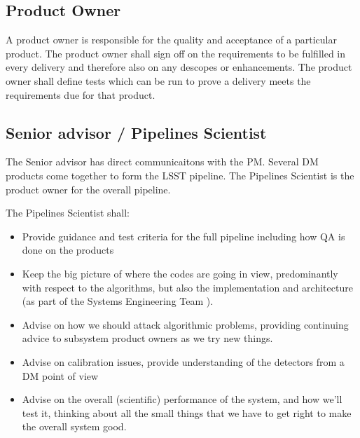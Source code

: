 \subsection{Product Owner \label{role:prodo}}

A product owner is responsible for the quality and acceptance of a particular product.
The product owner shall sign off on the requirements to be fulfilled in every delivery and therefore also on any descopes or enhancements.
The product owner shall define tests which can be run to prove a delivery meets the requirements due for that product.

\subsection{Senior advisor / Pipelines Scientist \label{role:pipe}}

The Senior advisor has direct communicaitons with the \gls{PM}. Several \gls{DM} products come together to form the \gls{LSST} \gls{pipeline}. The Pipelines Scientist is the product owner for the overall \gls{pipeline}.

The Pipelines Scientist shall:

\begin{itemize}

\item Provide guidance and test criteria for the full \gls{pipeline} including how \gls{QA} is done on the products
\item Keep the big picture of where the codes are going in view, predominantly with respect to the algorithms, but also the implementation and architecture (as part of the \gls{Systems Engineering} Team ).
\item Advise on how we should attack algorithmic problems, providing continuing advice to subsystem product owners as we try new things.
\item Advise on \gls{calibration} issues, provide understanding of the detectors from a \gls{DM} point of view
\item Advise on the overall (scientific) performance of the system, and how we'll test it, thinking about all the small things that we have to get right to make the overall system good.

\end{itemize}

